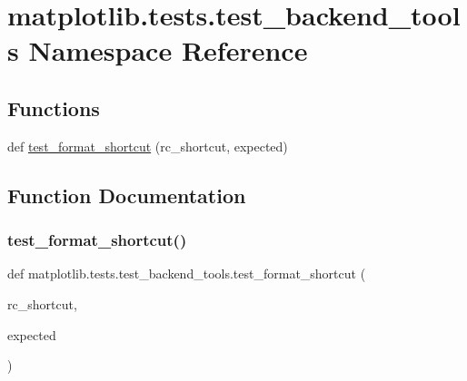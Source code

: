 \hypertarget{namespacematplotlib_1_1tests_1_1test__backend__tools}{}\section{matplotlib.\+tests.\+test\+\_\+backend\+\_\+tools Namespace Reference}
\label{namespacematplotlib_1_1tests_1_1test__backend__tools}
\subsection*{Functions}
\begin{DoxyCompactItemize}
\item 
def \hyperlink{namespacematplotlib_1_1tests_1_1test__backend__tools_adfeb8526c0b3ae6b1924fd8224d0986b}{test\+\_\+format\+\_\+shortcut} (rc\+\_\+shortcut, expected)
\end{DoxyCompactItemize}


\subsection{Function Documentation}
\mbox{\label{namespacematplotlib_1_1tests_1_1test__backend__tools_adfeb8526c0b3ae6b1924fd8224d0986b}} 
\subsubsection{\texorpdfstring{test\+\_\+format\+\_\+shortcut()}{test\_format\_shortcut()}}
{\footnotesize\ttfamily def matplotlib.\+tests.\+test\+\_\+backend\+\_\+tools.\+test\+\_\+format\+\_\+shortcut (\begin{DoxyParamCaption}\item[{}]{rc\+\_\+shortcut,  }\item[{}]{expected }\end{DoxyParamCaption})}

